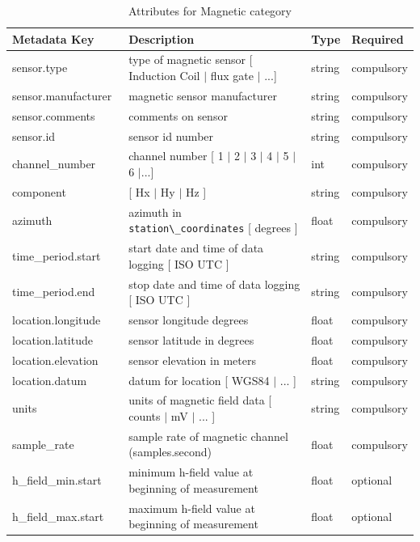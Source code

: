 \documentclass{article}
\begin{document}
\begin{table}[htb!]
    \caption[Attributes for Magnetic Channel]{Attributes for Magnetic category}
    \begin{tabular}{|l|p{3in}|l|l|}
        \hline
        \textbf{Metadata Key} & \textbf{Description} & \textbf{Type} & \textbf{Required} \\ \hline
        sensor.type\ & type of magnetic sensor [ Induction Coil $|$ flux gate $|$ ...] & string & compulsory \\ \hline
        sensor.manufacturer\ & magnetic sensor manufacturer & string &  compulsory \\ \hline
        sensor.comments\ & comments on sensor & string & compulsory \\ \hline
        sensor.id\ & sensor id number & string &  compulsory \\ \hline
        channel\_number\ & channel number [ 1 $|$ 2 $|$ 3 $|$ 4 $|$ 5 $|$ 6 $|$...] & int &  compulsory \\ \hline
        component\ & [ Hx $|$ Hy $|$ Hz ] & string  &  compulsory \\ \hline
        azimuth\ & azimuth in \verb|station\_coordinates| [ degrees ]& float & compulsory \\ \hline
        time\_period.start\ & start date and time of data logging [ ISO UTC ] & string & compulsory \\ \hline
        time\_period.end\ & stop date and time of data logging [ ISO UTC ] & string & compulsory \\ \hline
        location.longitude\ & sensor longitude degrees & float & compulsory \\ \hline
        location.latitude\ & sensor latitude in degrees & float &  compulsory \\ \hline
        location.elevation\ & sensor elevation in meters & float &  compulsory \\ \hline
        location.datum\ & datum for location [ WGS84 $|$ ... ] & string &  compulsory\\ \hline
        units\ & units of magnetic field data [ counts $|$ mV $|$ ... ] & string &  compulsory \\ \hline
        sample\_rate\ & sample rate of magnetic channel (samples.second) & float &  compulsory \\ \hline
        h\_field\_min.start\ & minimum h-field value at beginning of measurement & float &  optional \\ \hline
        h\_field\_max.start\ & maximum h-field value at beginning of measurement & float &  optional\\ \hline

\end{tabular}
\end{table}
\end{document}
